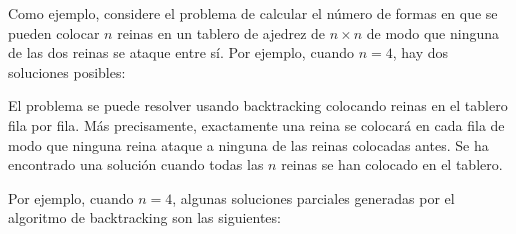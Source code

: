 
Como ejemplo, considere el problema de
calcular el número
de formas en que se pueden colocar $n$ reinas en
un tablero de ajedrez de $n \times n$ de modo que
ninguna de las dos reinas se ataque entre sí.
Por ejemplo, cuando $n=4$,
hay dos soluciones posibles:

\begin{center}
\end{center}

El problema se puede resolver usando backtracking
colocando reinas en el tablero fila por fila.
Más precisamente, exactamente una reina
se colocará en cada fila de modo que ninguna reina ataque
a ninguna de las reinas colocadas antes.
Se ha encontrado una solución cuando todas
las $n$ reinas se han colocado en el tablero.

Por ejemplo, cuando $n=4$,
algunas soluciones parciales generadas por
el algoritmo de backtracking son las siguientes:

